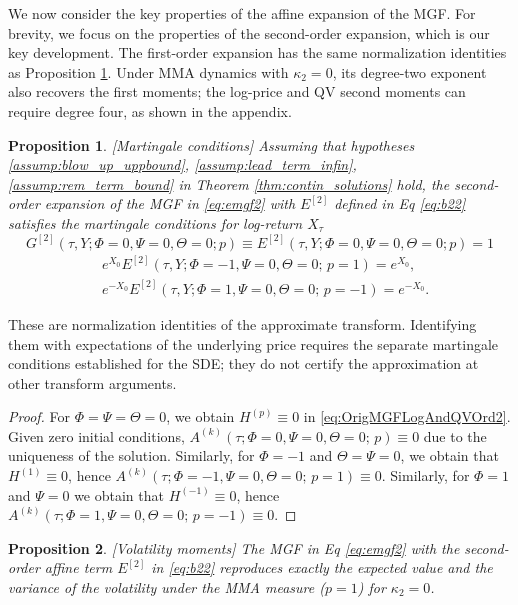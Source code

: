 \documentclass[11pt,a4paper] {article}
\newtheorem{proposition}{Proposition}[section]
\begin{document}
We now consider the key properties of the affine expansion of the MGF. For brevity, we focus on the properties of the second-order expansion, which is our key development. The first-order expansion has the same normalization identities as Proposition \ref{pr:mart2}. Under MMA dynamics with $\kappa_2=0$, its degree-two exponent also recovers the first moments; the log-price and QV second moments can require degree four, as shown in the appendix.

\begin{proposition}\label{pr:mart2} [Martingale conditions] Assuming that hypotheses \ref{assump:blow_up_uppbound},  \ref{assump:lead_term_infin}, \ref{assump:rem_term_bound} in Theorem \ref{thm:contin_solutions} hold, the second-order expansion of the MGF in \eqref{eq:emgf2} with $E^{[2]}$ defined in Eq \eqref{eq:b22} satisfies the martingale conditions for log-return $X_\tau$
\begin{equation}\label{eq:mart21}
G^{[2]}(\tau,Y; \Phi=0,\Psi=0,\Theta=0;p) \equiv E^{[2]}(\tau,Y; \Phi=0,\Psi=0,\Theta=0;p) =1
\end{equation}
\begin{equation}\label{eq:mart22}
\begin{split}
& e^{X_0} E^{[2]}(\tau,Y; \Phi=-1,\Psi=0,\Theta=0;\,p=1)=e^{X_0},\\
& e^{-X_0} E^{[2]}(\tau,Y; \Phi=1,\Psi=0,\Theta=0;\,p=-1)=e^{-X_0}.
\end{split}
\end{equation}
\end{proposition}
These are normalization identities of the approximate transform. Identifying
them with expectations of the underlying price requires the separate
martingale conditions established for the SDE; they do not certify the
approximation at other transform arguments.

\begin{proof}
For $\Phi=\Psi=\Theta=0$, we obtain $H^{(p)}\equiv 0$ in \eqref{eq:OrigMGFLogAndQVOrd2}. Given zero initial conditions, $A^{(k)}(\tau;\Phi=0,\Psi=0,\Theta=0;\,p)\equiv 0$ due to the uniqueness of the solution. Similarly, for $\Phi=-1$ and $\Theta=\Psi=0$, we obtain that $H^{(1)}\equiv 0$, hence $A^{(k)}(\tau;\Phi=-1,\Psi=0,\Theta=0;\,p=1)\equiv 0$. 
Similarly, for $\Phi=1$ and $\Psi=0$ we obtain that $H^{(-1)}\equiv 0$, hence $A^{(k)}(\tau;\Phi=1,\Psi=0,\Theta=0;\,p=-1)\equiv 0$. 
\end{proof}


\begin{proposition}\label{pr:volmoment} [Volatility moments] The MGF in Eq \eqref{eq:emgf2} with  the second-order affine term $E^{[2]}$ in \eqref{eq:b22} reproduces exactly the expected value and the variance of the volatility under the MMA measure ($p=1$) for $\kappa_{2}=0$.
\end{proposition}
\end{document}
